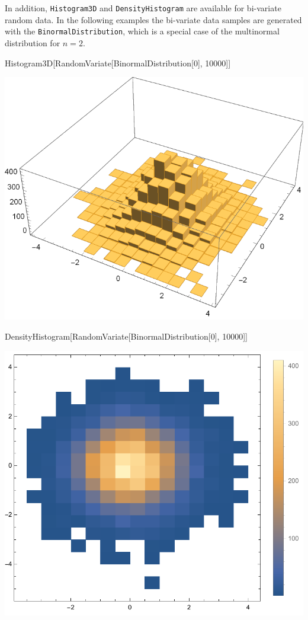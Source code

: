 \documentclass{tstextbook}
\begin{document}
In addition, \texttt{Histogram3D} and \texttt{DensityHistogram} are available for bi-variate random data. In the following examples the bi-variate data samples are generated with the \texttt{BinormalDistribution}, which is a special case of the multinormal distribution for $n=2$.

\begin{mathematica}
Histogram3D[RandomVariate[BinormalDistribution[0], 10000]]
\end{mathematica}

 \includegraphics[scale=0.8, center]{images/histogram_3d.pdf}
 
 \begin{mathematica}
DensityHistogram[RandomVariate[BinormalDistribution[0], 10000]]
\end{mathematica}

 \includegraphics[scale=0.8, center]{images/density_histogram.pdf}     
\end{document}
